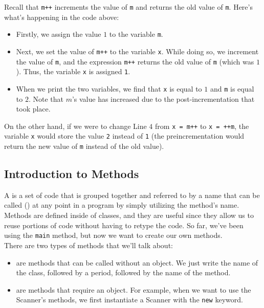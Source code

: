 Recall that \verb!m++! increments the value of \verb!m! and returns the old value of \verb!m!. Here's what's happening in the code above:

\begin{itemize}
    \item Firstly, we assign the value $1$ to the variable \verb!m!.
    \item Next, we set the value of \verb!m++! to the variable \verb!x!. While doing so, we increment the value of \verb!m!, and the expression \verb!m++! returns the old value of \verb!m! (which was $1$). Thus, the variable \verb!x! is assigned \verb!1!.
    \item When we print the two variables, we find that \verb!x! is equal to $1$ and \verb!m! is equal to $2$. Note that $m$'s value has increased due to the post-incrementation that took place.  
\end{itemize}

On the other hand, if we were to change Line $4$ from \verb!x = m++! to \verb!x = ++m!, the variable \verb!x! would store the value \verb!2! instead of \verb!1! (the preincrementation would return the new value of \verb!m! instead of the old value). 


\subsection{Introduction to Methods}

A  is a set of code that is grouped together and referred to by a name that can be called () at any point in a program by simply utilizing the method's name. Methods are defined inside of classes, and they are useful since they allow us to reuse portions of code without having to retype the code. So far, we've been using the \verb!main! method, but now we want to create our own methods. \\

There are two types of methods that we'll talk about: 

\begin{itemize}
    \item {} are methods that can be called without an object. We just write the name of the class, followed by a period, followed by the name of the method. 
    \item {} are methods that require an object. For example, when we want to use the Scanner's methods, we first instantiate a Scanner with the \verb!new! keyword. 
\end{itemize}

